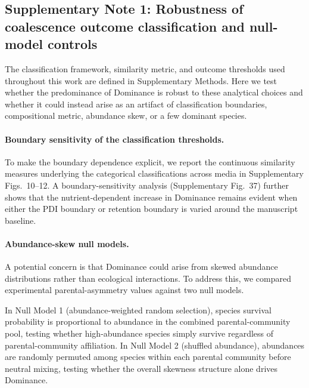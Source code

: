 
\subsection*{Supplementary Note 1: Robustness of coalescence outcome classification and null-model controls}
\label{sec:suppl:note1}

The classification framework, similarity metric, and outcome thresholds used throughout this work are defined in Supplementary Methods. Here we test whether the predominance of Dominance is robust to these analytical choices and whether it could instead arise as an artifact of classification boundaries, compositional metric, abundance skew, or a few dominant species.

\paragraph{Boundary sensitivity of the classification thresholds.}
To make the boundary dependence explicit, we report the continuous similarity measures underlying the categorical classifications across media in Supplementary Figs.~10--12. A boundary-sensitivity analysis (Supplementary Fig.~37) further shows that the nutrient-dependent increase in Dominance remains evident when either the PDI boundary or retention boundary is varied around the manuscript baseline.

\paragraph{Abundance-skew null models.}
A potential concern is that Dominance could arise from skewed abundance distributions rather than ecological interactions. To address this, we compared experimental parental-asymmetry values against two null models.

In Null Model 1 (abundance-weighted random selection), species survival probability is proportional to abundance in the combined parental-community pool, testing whether high-abundance species simply survive regardless of parental-community affiliation. In Null Model 2 (shuffled abundance), abundances are randomly permuted among species within each parental community before neutral mixing, testing whether the overall skewness structure alone drives Dominance.

